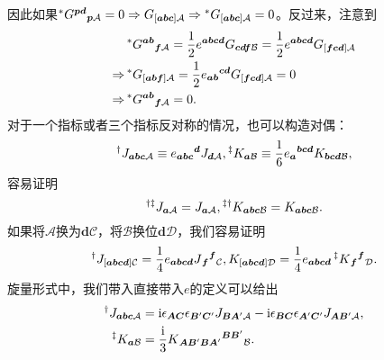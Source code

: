 因此如果$\prescript{*}{}{} G^{\boldsymbol{pd}}{}_{\boldsymbol{p}\mathcal{A}} =0\Rightarrow G_{[\boldsymbol{abc}]\mathcal{A}} \Rightarrow \prescript{*}{}{} G_{[\boldsymbol{abc}]\mathcal{A}} =0$。反过来，注意到
\begin{equation*}
	\begin{aligned}
		& \prescript{*}{}{} G^{\boldsymbol{ab}}{}_{\boldsymbol{f}\mathcal{A}} =\frac{1}{2} e^{\boldsymbol{abcd}} G_{\boldsymbol{cdf}\mathcal{B}} =\frac{1}{2} e^{\boldsymbol{abcd}} G_{[\boldsymbol{fcd}]\mathcal{A}}\\
		\Rightarrow  & \prescript{*}{}{} G_{[\boldsymbol{abf}]\mathcal{A}} =\frac{1}{2} e{_{\boldsymbol{ab}}}^{\boldsymbol{cd}} G_{[\boldsymbol{fcd}]\mathcal{A}} =0\\
		\Rightarrow  & \prescript{*}{}{} G^{\boldsymbol{ab}}{}_{\boldsymbol{f}\mathcal{A}} =0.
	\end{aligned}
\end{equation*}
对于一个指标或者三个指标反对称的情况，也可以构造对偶：
\begin{equation*}
	\prescript{\dagger }{}{} J_{\boldsymbol{abc}\mathcal{A}} \equiv e{_{\boldsymbol{abc}}}^{\boldsymbol{d}} J_{\boldsymbol{d}\mathcal{A}} ,\prescript{\ddagger }{}{} K_{\boldsymbol{a}\mathcal{B}} \equiv \frac{1}{6} e{_{\boldsymbol{a}}}^{\boldsymbol{bcd}} K_{\boldsymbol{bcd}\mathcal{B}} ,
\end{equation*}
容易证明
\begin{equation*}
	\prescript{\dagger \ddagger }{}{} J_{\boldsymbol{a}\mathcal{A}} =J_{\boldsymbol{a}\mathcal{A}} ,\prescript{\ddagger \dagger }{}{} K_{\boldsymbol{abc}\mathcal{B}} =K_{\boldsymbol{abc}\mathcal{B}} .
\end{equation*}
如果将$\mathcal{A}$换为$\boldsymbol{d}\mathcal{C}$，将$\mathcal{B}$换位$\boldsymbol{d}\mathcal{D}$，我们容易证明
\begin{equation*}
	\prescript{\dagger }{}{} J_{[\boldsymbol{abcd}]\mathcal{C}} =\frac{1}{4} e_{\boldsymbol{abcd}} J{_{\boldsymbol{f}}}^{\boldsymbol{f}}{}_{\mathcal{C}} ,K_{[\boldsymbol{abcd}]\mathcal{D}} =\frac{1}{4} e_{\boldsymbol{abcd}}\prescript{\ddagger }{}{} K{_{\boldsymbol{f}}}^{\boldsymbol{f}}{}_{\mathcal{D}} .
\end{equation*}
旋量形式中，我们带入直接带入$e$的定义可以给出
\begin{equation*}
	\begin{aligned}
		\prescript{\dagger }{}{} J_{\boldsymbol{abc}\mathcal{A}} & =\mathrm{i} \epsilon _{\boldsymbol{AC}} \epsilon _{\boldsymbol{B} '\boldsymbol{C} '} J_{\boldsymbol{BA} '\mathcal{A}} -\mathrm{i} \epsilon _{\boldsymbol{BC}} \epsilon _{\boldsymbol{A} '\boldsymbol{C} '} J_{\boldsymbol{AB} '\mathcal{A}} ,\\
		\prescript{\ddagger }{}{} K_{\boldsymbol{a}\mathcal{B}} & =\frac{\mathrm{i}}{3} K{_{\boldsymbol{AB} '\boldsymbol{BA} '}}^{\boldsymbol{BB} '}{}_{\mathcal{B}} .
	\end{aligned}
\end{equation*}
